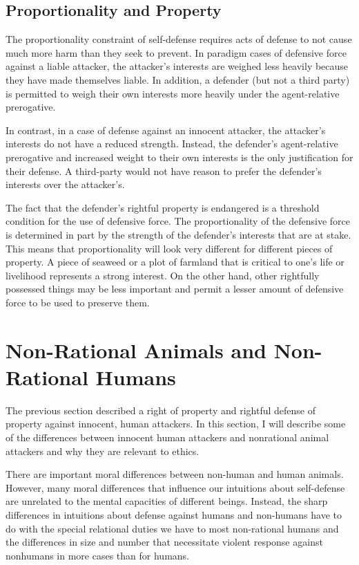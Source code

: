 	\subsection{Proportionality and Property}

	The proportionality constraint of self-defense requires acts of defense
	to not cause much more harm than they seek to prevent. In paradigm cases
	of defensive force against a liable attacker, the attacker’s interests
	are weighed less heavily because they have made themselves liable. In
	addition, a defender (but not a third party) is permitted to weigh their
	own interests more heavily under the agent-relative prerogative.

	In contrast, in a case of defense against an innocent attacker, the
	attacker’s interests do not have a reduced strength. Instead, the defender’s
	agent-relative prerogative and increased weight to their own interests is
	the only justification for their defense. A third-party would not have
	reason to prefer the defender’s interests over the attacker’s.

	The fact that the defender’s rightful property is endangered is a threshold
	condition for the use of defensive force. The proportionality of the
	defensive force is determined in part by the strength of the defender’s
	interests that are at stake. This means that proportionality will look very
	different for different pieces of property. A piece of seaweed or a plot of
	farmland that is critical to one’s life or livelihood represents a strong
	interest. On the other hand, other rightfully possessed things may be less
	important and permit a lesser amount of defensive force to be used to
	preserve them.

\section{Non-Rational Animals and Non-Rational Humans}
 
	The previous section described a right of property and rightful defense
	of property against innocent, human attackers. In this section, I will
	describe some of the differences between innocent human attackers and
	nonrational animal attackers and why they are relevant to ethics.
    
	There are important moral differences between non-human and human animals.
	However, many moral differences that influence our intuitions about
	self-defense are unrelated to the mental capacities of different beings.
	Instead, the sharp differences in intuitions about defense against humans
	and non-humans have to do with the special relational duties we have to
	most non-rational humans and the differences in size and number that
	necessitate violent response against nonhumans in more cases than for
	humans.

